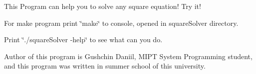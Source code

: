 This Program can help you to solve any square equation! Try it!

For make program print \char`\"{}make\char`\"{} to console, opened in square\+Solver directory.

Print \char`\"{}./square\+Solver -\/help\char`\"{} to see what can you do.

Author of this program is Gushchin Daniil, MIPT System Programming student, and this program was written in summer school of this university. 